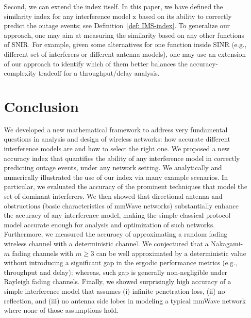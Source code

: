 \documentclass[12pt, draftclsnofoot, onecolumn]{IEEEtran}
\begin{document}
Second, we can extend the index itself. In this paper, we have defined the similarity index for any interference model $\mathrm{x}$ based on its ability to correctly predict the outage events; see Definition~\ref{def: IMS-index}. To generalize our approach, one may aim at measuring the similarity based on any other functions of SNIR. For example, given some alternatives for one function inside SINR (e.g., different set of interferers or different antenna models), one may use an extension of our approach to identify which of them better balances the accuracy-complexity tradeoff for a throughput/delay analysis.

\section{Conclusion}\label{sec: ConcludingRemarks}
We developed a new mathematical framework to address very fundamental questions in analysis and design of wireless networks: how accurate different interference models are and how to select the right one. We proposed a new accuracy index that quantifies the ability of any interference model in correctly predicting outage events, under any network setting. We analytically and numerically illustrated the use of our index via many example scenarios. In particular, we evaluated the accuracy of the prominent techniques that model the set of dominant interferers. We then showed that directional antenna and obstructions (basic characteristics of mmWave networks) substantially enhance the accuracy of any interference model, making the simple classical protocol model accurate enough for analysis and optimization of such networks. Furthermore, we measured the accuracy of approximating a random fading wireless channel with a deterministic channel. We conjectured that a Nakagami-$m$ fading channels with $m \geq 3$ can be well approximated by a deterministic value without introducing a significant gap in the ergodic performance metrics (e.g., throughput and delay); whereas, such gap is generally non-negligible under Rayleigh fading channels. Finally, we showed surprisingly high accuracy of a simple interference model that assumes (i) infinite penetration loss, (ii) no reflection, and (iii) no antenna side lobes in modeling a typical mmWave network where none of those assumptions hold.
\end{document}
